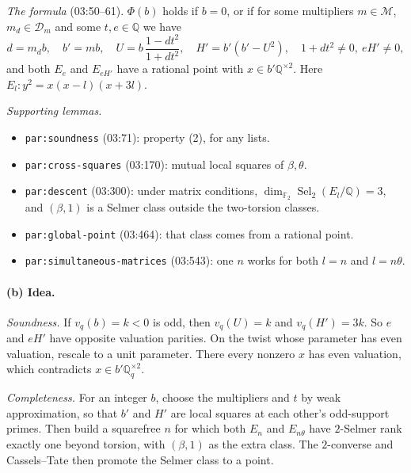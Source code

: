 \documentclass[11pt]{article}
\theoremstyle{definition}
\newcommand{\Q}{\mathbb Q}
\newcommand{\F}{\mathbb F}
\newcommand{\lbl}[1]{\texttt{#1}}
\newcommand{\src}[1]{\textsf{#1}}
\DeclareMathOperator{\Sel}{Sel}
\begin{document}
\emph{The formula} (\src{03:50--61}).  $\Phi(b)$ holds if $b=0$, or if for
some multipliers $m\in\mathcal M$, $m_d\in\mathcal D_m$ and some
$t,e\in\Q$ we have
\[
 d=m_db,\quad b'=mb,\quad U=b\,\frac{1-dt^2}{1+dt^2},\quad H'=b'(b'-U^2),
 \quad 1+dt^2\ne0,\ eH'\ne0,
\]
and both $E_e$ and $E_{eH'}$ have a rational point with
$x\in b'\Q^{\times2}$.  Here $E_l:y^2=x(x-l)(x+3l)$.

\emph{Supporting lemmas.}
\begin{itemize}
\item \lbl{par:soundness} (\src{03:71}): property (2), for any lists.
\item \lbl{par:cross-squares} (\src{03:170}): mutual local squares of
$\beta,\theta$.
\item \lbl{par:descent} (\src{03:300}): under matrix conditions,
$\dim_{\F_2}\Sel_2(E_l/\Q)=3$, and $(\beta,1)$ is a Selmer class outside the two-torsion classes.
\item \lbl{par:global-point} (\src{03:464}): that class comes from a
rational point.
\item \lbl{par:simultaneous-matrices} (\src{03:543}): one $n$ works for both
$l=n$ and $l=n\theta$.
\end{itemize}

\paragraph{(b) Idea.}
\emph{Soundness.}  If $v_q(b)=k<0$ is odd, then $v_q(U)=k$ and
$v_q(H')=3k$.  So $e$ and $eH'$ have opposite valuation parities.  On the
twist whose parameter has even valuation, rescale to a unit parameter.
There every nonzero $x$ has even valuation, which contradicts
$x\in b'\Q_q^{\times2}$.

\emph{Completeness.}  For an integer $b$, choose the multipliers and $t$ by
weak approximation, so that $b'$ and $H'$ are local squares at each other's
odd-support primes.  Then build a squarefree $n$ for which both $E_n$ and
$E_{n\theta}$ have $2$-Selmer rank exactly one beyond torsion, with $(\beta,1)$
as the extra class.  The $2$-converse and Cassels--Tate then promote the
Selmer class to a point.
\end{document}
